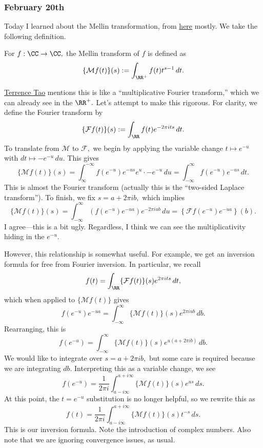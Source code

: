 \subsubsection{February 20th}
Today I learned about the Mellin transformation, from \href{http://dsp-book.narod.ru/TAH/ch11.pdf}{here} mostly. We take the following definition.
\begin{definition}
    For $f:\CC\to\CC,$ the Mellin transform of $f$ is defined as
    \[\{\mathcal Mf(t)\}(s):=\int_{\RR^+} f(t)t^{s-1}\,dt.\]
\end{definition}
\href{https://terrytao.wordpress.com/2008/07/27/tates-proof-of-the-functional-equation/}{Terrence Tao} mentions this is like a ``multiplicative Fourier transform,'' which we can already see in the $\RR^+.$ Let's attempt to make this rigorous. For clarity, we define the Fourier transform by
\[\{\mathcal Ff(t)\}(s):=\int_\RR f(t)e^{-2\pi its}\,dt.\]
To translate from $\mathcal M$ to $\mathcal F,$ we begin by applying the variable change $t\mapsto e^{-u}$ with $dt\mapsto-e^{-u}\,du.$ This gives
\[\{\mathcal Mf(t)\}(s)=\int_\infty^{-\infty}f\left(e^{-u}\right)e^{-us}e^u\cdot-e^{-u}\,du=\int_{-\infty}^\infty f\left(e^{-u}\right)e^{-us}\,dt.\]
This is almost the Fourier transform (actually this is the ``two-sided Laplace transform''). To finish, we fix $s=a+2\pi ib,$ which implies
\[\{\mathcal Mf(t)\}(s)=\int_{-\infty}^\infty\left(f\left(e^{-u}\right)e^{-ua}\right)e^{-2\pi iub}\,du=\left\{\mathcal Ff\left(e^{-u}\right)e^{-ua}\right\}(b).\]
I agree---this is a bit ugly. Regardless, I think we can see the multiplicativity hiding in the $e^{-u}.$

However, this relationship is somewhat useful. For example, we get an inversion formula for free from Fourier inversion. In particular, we recall
\[f(t)=\int_\RR\{\mathcal Ff(t)\}(s)e^{2\pi its}\,dt,\]
which when applied to $\{\mathcal Mf(t)\}$ gives
\[f\left(e^{-u}\right)e^{-ua}=\int_{-\infty}^\infty\{\mathcal Mf(t)\}(s)e^{2\pi iub}\,db.\]
Rearranging, this is
\[f\left(e^{-u}\right)=\int_{-\infty}^\infty\{\mathcal Mf(t)\}(s)e^{u(a+2\pi ib)}\,db.\]
We would like to integrate over $s=a+2\pi ib,$ but some care is required because we are integrating $db.$ Interpreting this as a variable change, we see
\[f\left(e^{-u}\right)=\frac1{2\pi i}\int_{a-i\infty}^{a+i\infty}\{\mathcal Mf(t)\}(s)e^{us}\,ds.\]
At this point, the $t=e^{-u}$ substitution is no longer helpful, so we rewrite this as
\[f(t)=\frac1{2\pi i}\int_{a-i\infty}^{a+i\infty}\{\mathcal Mf(t)\}(s)t^{-s}\,ds.\]
This is our inversion formula. Note the introduction of complex numbers. Also note that we are ignoring convergence issues, as usual.

